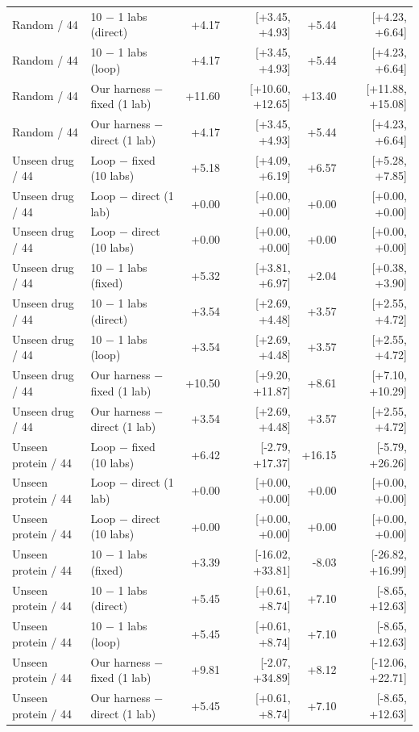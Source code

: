 \begin{longtable}{llrrrr}
Random / 44 & 10 $-$ 1 labs (direct) & +4.17 & [+3.45, +4.93] & +5.44 & [+4.23, +6.64] \\
Random / 44 & 10 $-$ 1 labs (loop) & +4.17 & [+3.45, +4.93] & +5.44 & [+4.23, +6.64] \\
Random / 44 & Our harness $-$ fixed (1 lab) & +11.60 & [+10.60, +12.65] & +13.40 & [+11.88, +15.08] \\
Random / 44 & Our harness $-$ direct (1 lab) & +4.17 & [+3.45, +4.93] & +5.44 & [+4.23, +6.64] \\
\midrule
Unseen drug / 44 & Loop $-$ fixed (10 labs) & +5.18 & [+4.09, +6.19] & +6.57 & [+5.28, +7.85] \\
Unseen drug / 44 & Loop $-$ direct (1 lab) & +0.00 & [+0.00, +0.00] & +0.00 & [+0.00, +0.00] \\
Unseen drug / 44 & Loop $-$ direct (10 labs) & +0.00 & [+0.00, +0.00] & +0.00 & [+0.00, +0.00] \\
Unseen drug / 44 & 10 $-$ 1 labs (fixed) & +5.32 & [+3.81, +6.97] & +2.04 & [+0.38, +3.90] \\
Unseen drug / 44 & 10 $-$ 1 labs (direct) & +3.54 & [+2.69, +4.48] & +3.57 & [+2.55, +4.72] \\
Unseen drug / 44 & 10 $-$ 1 labs (loop) & +3.54 & [+2.69, +4.48] & +3.57 & [+2.55, +4.72] \\
Unseen drug / 44 & Our harness $-$ fixed (1 lab) & +10.50 & [+9.20, +11.87] & +8.61 & [+7.10, +10.29] \\
Unseen drug / 44 & Our harness $-$ direct (1 lab) & +3.54 & [+2.69, +4.48] & +3.57 & [+2.55, +4.72] \\
\midrule
Unseen protein / 44 & Loop $-$ fixed (10 labs) & +6.42 & [-2.79, +17.37] & +16.15 & [-5.79, +26.26] \\
Unseen protein / 44 & Loop $-$ direct (1 lab) & +0.00 & [+0.00, +0.00] & +0.00 & [+0.00, +0.00] \\
Unseen protein / 44 & Loop $-$ direct (10 labs) & +0.00 & [+0.00, +0.00] & +0.00 & [+0.00, +0.00] \\
Unseen protein / 44 & 10 $-$ 1 labs (fixed) & +3.39 & [-16.02, +33.81] & -8.03 & [-26.82, +16.99] \\
Unseen protein / 44 & 10 $-$ 1 labs (direct) & +5.45 & [+0.61, +8.74] & +7.10 & [-8.65, +12.63] \\
Unseen protein / 44 & 10 $-$ 1 labs (loop) & +5.45 & [+0.61, +8.74] & +7.10 & [-8.65, +12.63] \\
Unseen protein / 44 & Our harness $-$ fixed (1 lab) & +9.81 & [-2.07, +34.89] & +8.12 & [-12.06, +22.71] \\
Unseen protein / 44 & Our harness $-$ direct (1 lab) & +5.45 & [+0.61, +8.74] & +7.10 & [-8.65, +12.63] \\
\midrule
\bottomrule
\end{longtable}
\endgroup

